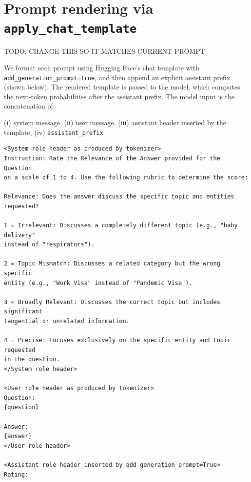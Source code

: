 \section{Prompt rendering via \texttt{apply\_chat\_template}}\label{app:apply_chat_template}

TODO: CHANGE THIS SO IT MATCHES CURRENT PROMPT

We format each prompt using Hugging Face's chat template with
\texttt{add\_generation\_prompt=True}, and then append an explicit assistant
prefix (shown below). The rendered template is passed to the model, which computes the next-token probabilities after the assistant prefix. The model input is the concatenation of:

(i) system message, (ii) user message, (iii) assistant header inserted by the
template, (iv) \texttt{assistant\_prefix}.

\begin{lstlisting}[basicstyle=\ttfamily\small, breaklines=true]
<System role header as produced by tokenizer>
Instruction: Rate the Relevance of the Answer provided for the Question
on a scale of 1 to 4. Use the following rubric to determine the score:

Relevance: Does the answer discuss the specific topic and entities requested?

1 = Irrelevant: Discusses a completely different topic (e.g., "baby delivery"
instead of "respirators").

2 = Topic Mismatch: Discusses a related category but the wrong specific
entity (e.g., "Work Visa" instead of "Pandemic Visa").

3 = Broadly Relevant: Discusses the correct topic but includes significant
tangential or unrelated information.

4 = Precise: Focuses exclusively on the specific entity and topic requested
in the question.
</System role header>

<User role header as produced by tokenizer>
Question:
{question}

Answer:
{answer}
</User role header>

<Assistant role header inserted by add_generation_prompt=True>
Rating: 
\end{lstlisting}